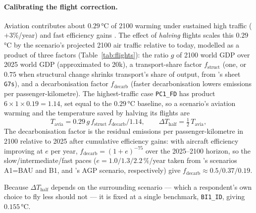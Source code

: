 \documentclass[12pt,a4paper]{article}
\newcommand{\scenario}[1]{\texttt{#1}}
\newcommand{\col}[1]{\texttt{#1}}
\newcommand{\EUR}{\texteuro}
\begin{document}
\paragraph{Calibrating the flight correction.} Aviation contributes about $0.29$\,°C of 2100 warming under sustained high traffic ($+3\%$/year) and fast efficiency gains \citep{Smith2026}. %
The effect of \emph{halving} flights scales this $0.29$\,°C by the scenario's projected 2100 air traffic relative to today, modelled as a product of three factors (Table~\ref{tab:flights}): the ratio $g$ of 2100 world GDP over 2025 world GDP (approximated to 20k\EUR), a transport-share factor $f_{\text{struct}}$ (one, or $0.75$ when structural change shrinks transport's share of output, from \citeauthor{Chancel2026}'s sheet \col{G7s}), and a decarbonisation factor $f_{\text{decarb}}$ (faster decarbonisation lowers emissions per passenger-kilometre). The highest-traffic case \scenario{PC1\_FD} has product $6\times1\times0.19=1.14$, set equal to the $0.29$\,°C baseline, so a scenario's aviation warming and the temperature saved by halving its flights are
\[
  T_{\text{avia}} = 0.29\,g\,f_{\text{struct}}\,f_{\text{decarb}}/1.14,
  \qquad
  \Delta T_{\text{half}} = \tfrac12\,T_{\text{avia}},
\]
The decarbonisation factor is the residual emissions per passenger-kilometre in 2100 relative to 2025 after cumulative efficiency gains: with aircraft efficiency improving at $e$ per year, $f_{\text{decarb}}=(1+e)^{-75}$ over the 2025--2100 horizon, so the slow/intermediate/fast paces ($e=1.0/1.3/2.2\,\%$/year taken from \citeauthor{Terrenoire2019}'s scenarios A1=BAU and B1, and \citeauthor{Smith2026}'s AGP scenario, respectively) give $f_{\text{decarb}}\approx0.5/0.37/0.19$.

Because $\Delta T_{\text{half}}$ depends on the surrounding scenario --- which a respondent's own choice to fly less should not --- it is fixed at a single benchmark, \scenario{BI1\_ID}, %
giving $\mathbf{0.155}$\,°C. %
\end{document}

